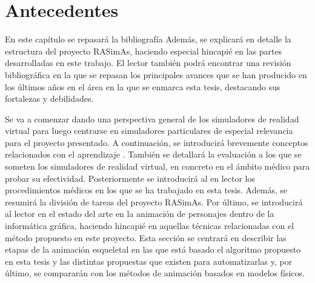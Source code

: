 \chapter{Antecedentes} 
\label{cap:related}



En este capítulo se repasará la bibliografía 
Además, se explicará en detalle la estructura del proyecto RASimAs, haciendo especial hincapié en las partes desarrolladas en este trabajo. El lector también podrá encontrar una revisión bibliográfica en la que se repasan los principales avances que se han producido en los últimos años en el área en la que se enmarca esta tesis, destacando sus fortalezas y debilidades. 

Se va a comenzar dando una perspectiva general de los simuladores de realidad virtual para luego centrarse en simuladores particulares de especial relevancia para el proyecto presentado. A continuación, se introducirá brevemente conceptos relacionados con el aprendizaje . También se detallará la evaluación a los que se someten los simuladores de realidad virtual, en concreto en el ámbito médico para probar su efectividad. Posteriormente se introducirá al en lector los procedimientos médicos en los que se ha trabajado en esta tesis. Además, se resumirá la división de tareas del proyecto \ac{RASimAs}. 
Por último, se introducirá al lector en el estado del arte  en la animación de personajes dentro de la informática gráfica, haciendo hincapié en aquellas técnicas relacionadas con el método propuesto en este proyecto. Esta sección se centrará en describir las etapas de la animación esqueletal en las que está basado el algoritmo propuesto en esta tesis y las distintas propuestas que existen para automatizarlas y, por último, se compararán con los métodos de animación basados en modelos físicos.


